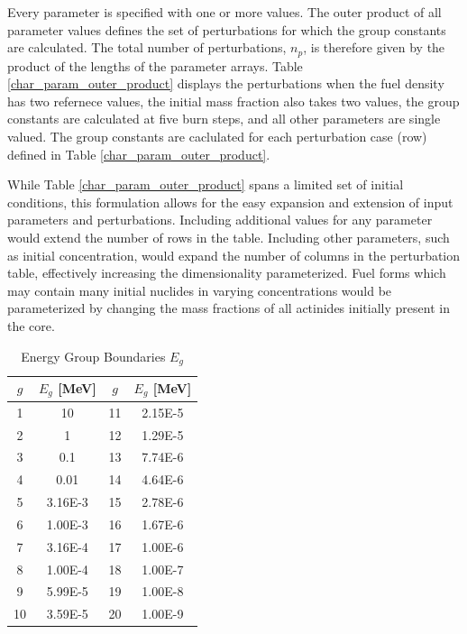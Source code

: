 Every parameter is specified with one or more values.  The outer product of all parameter
values defines the set of perturbations for which the group constants are calculated.
The total number of perturbations, $n_p$, is therefore given by the product of 
the lengths of the parameter arrays.  Table \ref{char_param_outer_product} 
displays the perturbations when the fuel density has two refernece values, the initial  mass 
fraction also takes two values, the group constants are calculated at five burn steps, and all 
other parameters are single valued.  The group constants are caclulated for each perturbation
case (row) defined in Table \ref{char_param_outer_product}.

While Table \ref{char_param_outer_product} spans a limited set of initial conditions, this formulation 
allows for the easy expansion and extension of input parameters and perturbations. 
Including additional values for any parameter would extend the number of rows in the table.  
Including other parameters, such as initial  concentration, would expand the number of
columns in the perturbation table, effectively increasing the dimensionality parameterized.
Fuel forms which may contain many initial nuclides in varying concentrations would be parameterized 
by changing the mass fractions of all actinides initially present in the core.  

\begin{table}[htbp]
\begin{center}
\caption{Energy Group Boundaries $E_g$}
\label{group_boundaries}
\begin{tabular}{|c|c||c|c|}
\hline
\textbf{$g$} & \textbf{$E_g$ [MeV]} & \textbf{$g$} & \textbf{$E_g$ [MeV]} \\
\hline
1  & 10      & 11 & 2.15E-5 \\ 
2  & 1       & 12 & 1.29E-5 \\ 
3  & 0.1     & 13 & 7.74E-6 \\
4  & 0.01    & 14 & 4.64E-6 \\
5  & 3.16E-3 & 15 & 2.78E-6 \\
6  & 1.00E-3 & 16 & 1.67E-6 \\
7  & 3.16E-4 & 17 & 1.00E-6 \\
8  & 1.00E-4 & 18 & 1.00E-7 \\
9  & 5.99E-5 & 19 & 1.00E-8 \\
10 & 3.59E-5 & 20 & 1.00E-9 \\
\hline
\end{tabular}
\end{center}
\end{table}

